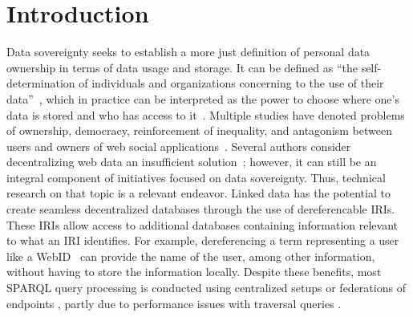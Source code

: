 \section{Introduction}

Data sovereignty seeks to establish a more just definition of personal data ownership in terms of data usage and storage.
It can be defined as ``the self-determination of individuals and organizations concerning to the use of their data''~\cite{verstraete2022solid},
which in practice can be interpreted as the power to choose where one's data is stored and who has access to it~\cite{verstraete2022solid}.
Multiple studies have denoted problems of ownership, democracy, reinforcement of inequality, and antagonism between users and owners of web social applications~\cite{Terranova2000FreeLP, Curran2016ch1, Sevignani2013, 9663788}.
Several authors consider decentralizing web data an insufficient solution~\cite{9663788, Curran2016ch1}; however, it can still be an integral component of initiatives focused on data sovereignty.
Thus, technical research on that topic is a relevant endeavor.
Linked data has the potential to create seamless decentralized databases  through the use of dereferencable IRIs.
These IRIs allow access to additional databases containing information relevant to what an IRI identifies.
For example, dereferencing a term representing a user like a WebID~ can provide the name of the user, among other information, without having 
to store the information locally. 
Despite these benefits, most SPARQL query processing is conducted using centralized setups or federations of endpoints , partly due to performance issues with traversal queries .

